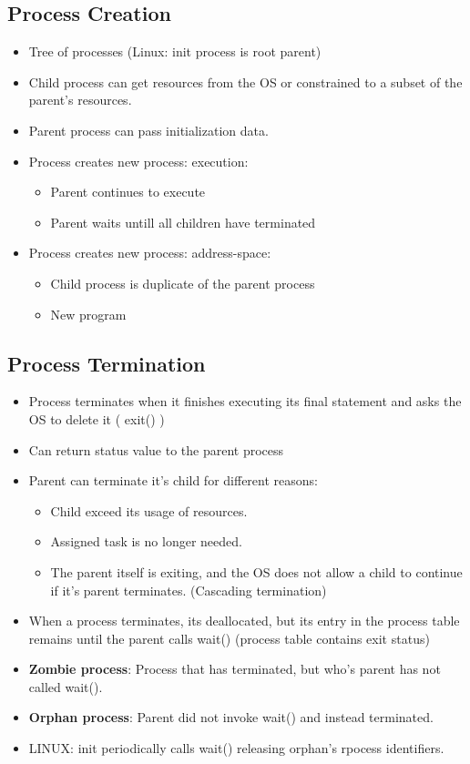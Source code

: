 \documentclass[10pt]{report}
\begin{document}
		\subsection{Process Creation}
			\begin{itemize}
				\item Tree of processes (Linux: init process is root parent)
				\item Child process can get resources from the OS or constrained to a subset of the parent's resources.
				\item Parent process can pass initialization data.
				\item Process creates new process: execution:
				\begin{itemize}
					\item Parent continues to execute
					\item Parent waits untill all children have terminated
				\end{itemize}
				\item Process creates new process: address-space:
				\begin{itemize}
					\item Child process is duplicate of the parent process
					\item New program
				\end{itemize}
			\end{itemize}

		\subsection{Process Termination}
			\begin{itemize}
				\item Process terminates when it finishes executing its final statement and asks the OS to delete it ( exit() )
				\item Can return status value to the parent process
				\item Parent can terminate it's child for different reasons:
				\begin{itemize}
					\item Child exceed its usage of resources.
					\item Assigned task is no longer needed.
					\item The parent itself is exiting, and the OS does not allow a child to continue if it's parent terminates. (Cascading termination)
				\end{itemize}

				\item When a process terminates, its deallocated, but its entry in the process table remains until the parent calls wait() (process table contains exit status)
				\item \textbf{Zombie process}: Process that has terminated, but who's parent has not called wait().
				\item \textbf{Orphan process}: Parent did not invoke wait() and instead terminated.
				\item LINUX: init periodically calls wait() releasing orphan's rpocess identifiers.
			\end{itemize}
\end{document}
